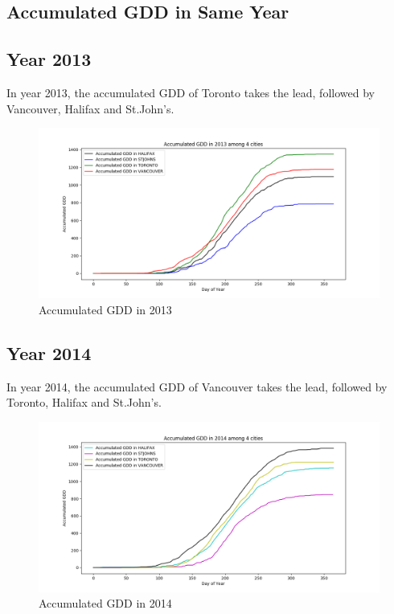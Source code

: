 \documentclass[12pt]{article}
\begin{document}
\subsection{ \bf Accumulated GDD in Same Year  }


\subsection{Year 2013}

In year 2013, the accumulated GDD of Toronto takes the lead, followed by Vancouver, Halifax and St.John's.
\begin{figure}[H]
\includegraphics[width=5.25in]{../Plot/accGDD_2013.png}



\caption{Accumulated GDD in 2013}
\label{5}
\end{figure}


\subsection{Year 2014}

In year 2014, the accumulated GDD of Vancouver takes the lead, followed by Toronto, Halifax and St.John's.
\begin{figure}[H]
\includegraphics[width=5.25in]{../Plot/accGDD_2014.png}



\caption{Accumulated GDD in 2014}
\label{6}
\end{figure}
\end{document}
